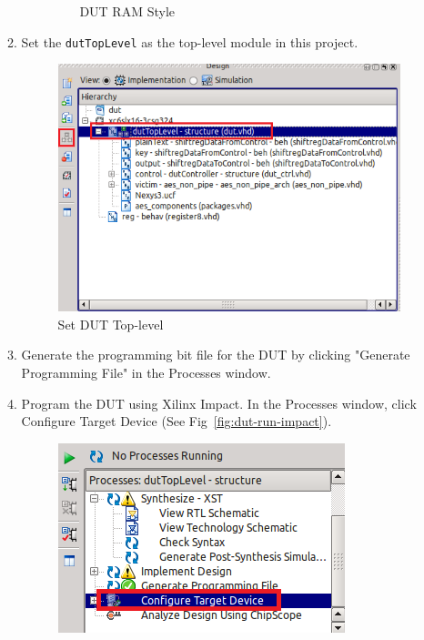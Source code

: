 \begin{enumerate}
\begin{enumerate}
\begin{enumerate}
\begin{figure}[H]
\begin{center}
		\caption{\label{fig:dut-ram-style}DUT RAM Style}
		\end{center}
		\vspace{-3ex}
		\end{figure}
     \end{enumerate}
  \item Set the \texttt{dutTopLevel} as the top-level module in this project.
		\begin{figure}[H]
		\begin{center}
		\includegraphics[scale=0.6]{figures/dut-set-top-level}
		\caption{\label{fig:dut-set-top-level}Set DUT Top-level}
		\end{center}
		\vspace{-3ex}
		\end{figure}
  \item Generate the programming bit file for the DUT by clicking "Generate Programming File" in the Processes window.
  \item Program the DUT using Xilinx Impact. In the Processes window, click Configure Target Device (See Fig~\ref{fig:dut-run-impact}).
		\begin{figure}[H]
		\begin{center}
		\includegraphics[scale=0.6]{figures/dut-run-impact}

\end{center}
\end{figure}
\end{enumerate}
\end{enumerate}
